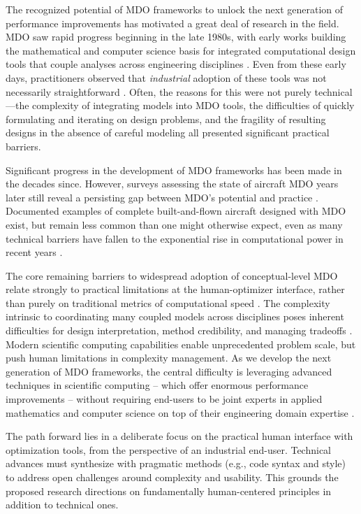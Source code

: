The recognized potential of MDO frameworks to unlock the next generation of performance improvements has motivated a great deal of research in the field. MDO saw rapid progress beginning in the late 1980s, with early works building the mathematical and computer science basis for integrated computational design tools that couple analyses across engineering disciplines \cite{ashley_making_1982, vanderplaats_automated_1976, haftka_multidisciplinary_1997}. Even from these early days, practitioners observed that \emph{industrial} adoption of these tools was not necessarily straightforward \cite{kroo_multidisciplinary_1997, drela_pros_1998}. Often, the reasons for this were not purely technical—the complexity of integrating models into MDO tools, the difficulties of quickly formulating and iterating on design problems, and the fragility of resulting designs in the absence of careful modeling all presented significant practical barriers.

Significant progress in the development of MDO frameworks has been made in the decades since. However, surveys assessing the state of aircraft MDO years later still reveal a persisting gap between MDO’s potential and practice \cite{agte_mdo_2010, drela_design_2011}. Documented examples of complete built-and-flown aircraft designed with MDO exist, but remain less common than one might otherwise expect, even as many technical barriers have fallen to the exponential rise in computational power in recent years \cite{gazaix_industrialization_2017}.

The core remaining barriers to widespread adoption of conceptual-level MDO relate strongly to practical limitations at the human-optimizer interface, rather than purely on traditional metrics of computational speed \cite{gpkit}. The complexity intrinsic to coordinating many coupled models across disciplines poses inherent difficulties for design interpretation, method credibility, and managing tradeoffs \cite{salas_framework_1998}. Modern scientific computing capabilities enable unprecedented problem scale, but push human limitations in complexity management. As we develop the next generation of MDO frameworks, the central difficulty is leveraging advanced techniques in scientific computing -- which offer enormous performance improvements -- without requiring end-users to be joint experts in applied mathematics and computer science on top of their engineering domain expertise \cite{ma_modelingtoolkit_2021}.

The path forward lies in a deliberate focus on the practical human interface with optimization tools, from the perspective of an industrial end-user. Technical advances must synthesize with pragmatic methods (e.g., code syntax and style) to address open challenges around complexity and usability. This grounds the proposed research directions on fundamentally human-centered principles in addition to technical ones.

